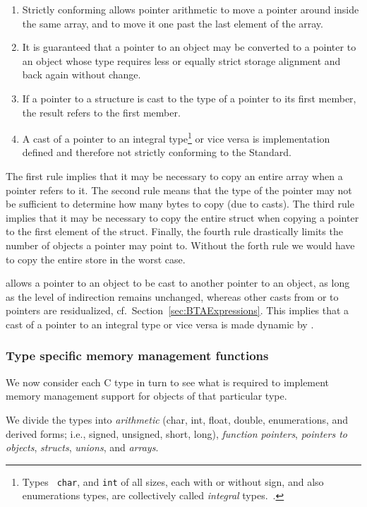 \begin{docpart}
\begin{enumerate}
\item \label{item-array} Strictly conforming \ansiC allows pointer
arithmetic to move a pointer around inside the same array, and to move
it one past the last element of the array.
\item It is guaranteed that a pointer to an object may be converted to
a pointer to an object whose type requires less or equally strict
storage alignment and back again without change.
\item\label{rule-first-member} If a pointer to a structure is cast
to the type of a pointer to its first member, the result refers to the
first member.
\item A cast of a pointer to an integral type\footnote{Types {\tt
char}, and {\tt int} of all sizes, each with or without sign, and also
enumerations types, are collectively called \emph{integral}
types.~\cite{Kernighan:1988:CProgrammingLanguage}.} or vice versa is implementation
defined and therefore not strictly conforming to the Standard.
\end{enumerate}
The first rule implies that it may be necessary to copy an
entire array when a pointer refers to it. The second rule means that
the type of the pointer may not be sufficient to determine how many
bytes to copy (due to casts). The third rule implies that it may be
necessary to copy the entire struct when copying a pointer to the
first element of the struct. Finally, the fourth rule drastically
limits the number of objects a pointer may point to. Without the forth
rule we would have to copy the entire store in the worst case.

\cmix allows a pointer to an object to be cast to another pointer to an
object, as long as the level of indirection remains unchanged, whereas
other casts from or to pointers are residualized, cf.\ 
Section~\vref{sec:BTAExpressions}. This implies that a cast of a pointer to
an integral type or vice versa is made dynamic by \cmix.


\subsubsection{Type specific memory management functions}
\label{sec:TypeSpecificMemoryFunctions}

We now consider each C type in turn to see what is
required to implement memory management support for objects of that
particular type.

We divide the types into \emph{arithmetic} (char, int, float, double,
enumerations, and derived forms; i.e., signed, unsigned, short, long),
\emph{function pointers}, \emph{pointers to objects}, \emph{structs},
\emph{unions}, and \emph{arrays}.



\end{docpart}

